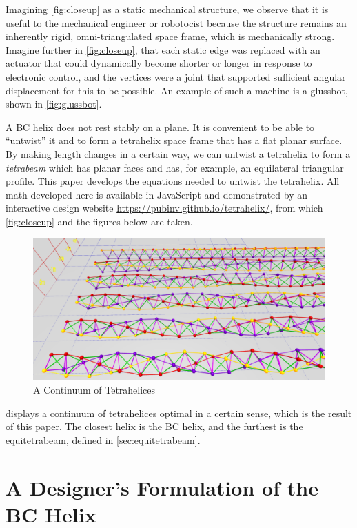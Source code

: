 \documentclass[review]{siamonline1116}
\begin{document}
Imagining \cref{fig:closeup} as a static mechanical structure,
we observe that it is useful to the mechanical engineer or
robotocist because the structure remains an inherently rigid,
omni-triangulated space frame, which is
mechanically strong.
Imagine further in \cref{fig:closeup}, that each static edge was replaced with an
actuator that could dynamically become shorter or longer in response to electronic control,
and the vertices were a joint that supported sufficient angular displacement
for this to be possible. An example of such a machine is a glussbot, shown in \cref{fig:glussbot}.

A BC helix does not rest stably on a plane. It is convenient to
be able to ``untwist'' it and to form a tetrahelix space frame that has a
flat planar surface. By making length changes in a certain way, we can
untwist a tetrahelix to form a \emph{tetrabeam} which has planar faces
and has, for example, an equilateral triangular profile. This paper
develops the equations needed to untwist the tetrahelix. All math
developed here is available in JavaScript and demonstrated by an interactive
design website \url{https://pubinv.github.io/tetrahelix/}\cite{readtetrahelix},
from which \cref{fig:closeup} and
the figures below are taken.

\begin{figure}
  \centering
     \includegraphics[width=1.0\textwidth]{figures/TetrahelixSeries2.png}
     \caption{A Continuum of Tetrahelices}
  \label{fig:series}
\end{figure}


 displays a continuum of tetrahelices optimal in a certain sense, which is the result of this
paper. The closest helix is the BC helix, and the furthest
is the equitetrabeam, defined in \cref{sec:equitetrabeam}.

\section{A Designer's Formulation of the BC Helix}
\end{document}
